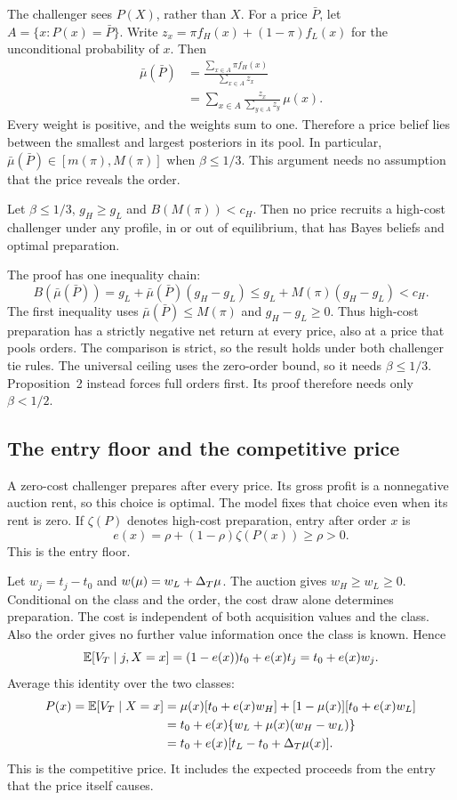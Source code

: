 The challenger sees $P(X)$, rather than $X$.
For a price $\bar P$, let $A=\{x:P(x)=\bar P\}$.
Write $z_x=\pi f_H(x)+(1-\pi)f_L(x)$ for the unconditional probability of $x$.
Then
\begin{align*}
\bar\mu(\bar P)
&=\frac{\sum_{x\in A}\pi f_H(x)}{\sum_{x\in A}z_x}\\
&=\sum_{x\in A}\frac{z_x}{\sum_{y\in A}z_y}\,\mu(x).
\end{align*}
Every weight is positive, and the weights sum to one.
Therefore a price belief lies between the smallest and largest posteriors in its pool.
In particular, $\bar\mu(\bar P)\in[m(\pi),M(\pi)]$ when $\beta\le1/3$.
This argument needs no assumption that the price reveals the order.

\begin{resultbox}
Let $\beta\le1/3$, $g_H\ge g_L$ and $B(M(\pi))<c_H$.
Then no price recruits a high-cost challenger under any profile, in or out of equilibrium, that has Bayes beliefs and optimal preparation.
\end{resultbox}

The proof has one inequality chain:
\[
B(\bar\mu(\bar P))=g_L+\bar\mu(\bar P)(g_H-g_L)
\le g_L+M(\pi)(g_H-g_L)<c_H.
\]
The first inequality uses $\bar\mu(\bar P)\le M(\pi)$ and $g_H-g_L\ge0$.
Thus high-cost preparation has a strictly negative net return at every price, also at a price that pools orders.
The comparison is strict, so the result holds under both challenger tie rules.
The universal ceiling uses the zero-order bound, so it needs $\beta\le1/3$.
Proposition~2 instead forces full orders first.
Its proof therefore needs only $\beta<1/2$.

\subsection{The entry floor and the competitive price}
\label{sec:04_slot_beliefs-price}

A zero-cost challenger prepares after every price.
Its gross profit is a nonnegative auction rent, so this choice is optimal.
The model fixes that choice even when its rent is zero.
If $\zeta(P)$ denotes high-cost preparation, entry after order $x$ is
\[
e(x)=\rho+(1-\rho)\zeta(P(x))\ge\rho>0.
\]
This is the entry floor. 

Let $w_j=t_j-t_0$ and $w(\mu)=w_L+\Delta_T\mu$.
The auction gives $w_H\ge w_L\ge0$.
Conditional on the class and the order, the cost draw alone determines preparation.
The cost is independent of both acquisition values and the class.
Also the order gives no further value information once the class is known.
Hence
\[
\mathbb{E}[V_T\mid j,X=x]=(1-e(x))t_0+e(x)t_j=t_0+e(x)w_j.
\]
Average this identity over the two classes:
\begin{align*}
P(x)=\mathbb{E}[V_T\mid X=x]
&=\mu(x)[t_0+e(x)w_H]+[1-\mu(x)][t_0+e(x)w_L]\\
&=t_0+e(x)\{w_L+\mu(x)(w_H-w_L)\}\\
&=t_0+e(x)[t_L-t_0+\Delta_T\mu(x)].
\end{align*}
This is the competitive price. 
It includes the expected proceeds from the entry that the price itself causes.

